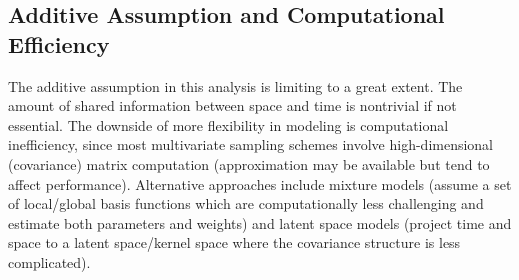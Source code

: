 \documentclass[12pt]{article}
\begin{document}
\subsection{Additive Assumption and Computational Efficiency}
The additive assumption in this analysis is limiting to a great extent. The amount of shared information between space and time is nontrivial if not essential. The downside of more flexibility in modeling is computational inefficiency, since most multivariate sampling schemes involve high-dimensional (covariance) matrix computation (approximation may be available but tend to affect performance). Alternative approaches include mixture models (assume a set of local/global basis functions which are computationally less challenging and estimate both parameters and weights) and latent space models (project time and space to a latent space/kernel space where the covariance structure is less complicated).
\end{document}
